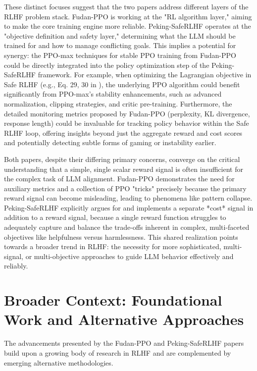 \documentclass[10pt,journal,compsoc]{IEEEtran} %
\begin{document}
These distinct focuses suggest that the two papers address different layers of the RLHF problem stack. Fudan-PPO is working at the "RL algorithm layer," aiming to make the core training engine more reliable. Peking-SafeRLHF operates at the "objective definition and safety layer," determining what the LLM should be trained for and how to manage conflicting goals. This implies a potential for synergy: the PPO-max techniques for stable PPO training from Fudan-PPO could be directly integrated into the policy optimization step of the Peking-SafeRLHF framework. For example, when optimizing the Lagrangian objective in Safe RLHF (e.g., Eq. 29, 30 in \cite{Dai2023SafeRLHF}), the underlying PPO algorithm could benefit significantly from PPO-max's stability enhancements, such as advanced normalization, clipping strategies, and critic pre-training. Furthermore, the detailed monitoring metrics proposed by Fudan-PPO (perplexity, KL divergence, response length) could be invaluable for tracking policy behavior within the Safe RLHF loop, offering insights beyond just the aggregate reward and cost scores and potentially detecting subtle forms of gaming or instability earlier.

Both papers, despite their differing primary concerns, converge on the critical understanding that a simple, single scalar reward signal is often insufficient for the complex task of LLM alignment. Fudan-PPO demonstrates the need for auxiliary metrics and a collection of PPO "tricks" precisely because the primary reward signal can become misleading, leading to phenomena like pattern collapse. Peking-SafeRLHF explicitly argues for and implements a separate *cost* signal in addition to a reward signal, because a single reward function struggles to adequately capture and balance the trade-offs inherent in complex, multi-faceted objectives like helpfulness versus harmlessness. This shared realization points towards a broader trend in RLHF: the necessity for more sophisticated, multi-signal, or multi-objective approaches to guide LLM behavior effectively and reliably.

\section{Broader Context: Foundational Work and Alternative Approaches}
\label{sec:broader_context}

The advancements presented by the Fudan-PPO and Peking-SafeRLHF papers build upon a growing body of research in RLHF and are complemented by emerging alternative methodologies.
\end{document}
